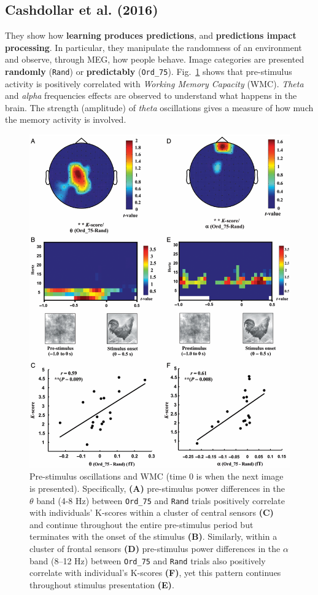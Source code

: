 \subsection{Cashdollar et al. (2016)}
They show how \textbf{learning produces predictions}, and \textbf{predictions impact processing}. In particular, they manipulate the randomness of an environment and observe, through MEG, how people behave. Image categories are presented \textbf{randomly} (\texttt{Rand}) or \textbf{predictably} (\texttt{Ord\_75}). Fig.~\ref{fig:cashdollar} shows that pre-stimulus activity is positively correlated with \textit{Working Memory Capacity} (WMC). \textit{Theta} and \textit{alpha} frequencies effects are observed to understand what happens in the brain. The strength (amplitude) of \textit{theta} oscillations gives a measure of how much the memory activity is involved.

\begin{figure}[!ht]
    \centering
    \captionsetup{width=.8\linewidth}
    \includegraphics[width=0.75\linewidth]{images/cashdollar.png}
    \caption{Pre-stimulus oscillations and WMC (time 0 is when the next image is presented). Specifically, \textbf{(A)} pre-stimulus power differences in the $\theta$ band (4-8 Hz) between \texttt{Ord\_75} and \texttt{Rand} trials positively correlate with individuals' K-scores within a cluster of central sensors \textbf{(C)} and continue throughout the entire pre-stimulus period but terminates with the onset of the stimulus \textbf{(B)}. Similarly, within a cluster of frontal sensors \textbf{(D)} pre-stimulus power differences in the $\alpha$ band (8–12 Hz) between \texttt{Ord\_75} and \texttt{Rand} trials also positively correlate with individual's K-scores \textbf{(F)}, yet this pattern continues throughout stimulus presentation \textbf{(E)}.}
    \label{fig:cashdollar}
\end{figure}

